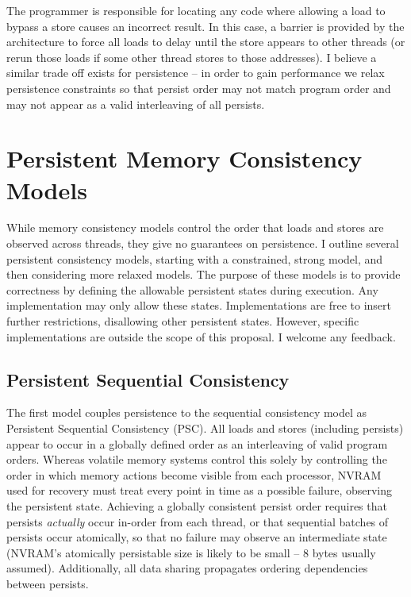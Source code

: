 The programmer is responsible for locating any code where allowing a load to bypass a store causes an incorrect result.
In this case, a barrier is provided by the architecture to force all loads to delay until the store appears to other threads (or rerun those loads if some other thread stores to those addresses).
I believe a similar trade off exists for persistence -- in order to gain performance we relax persistence constraints so that persist order may not match program order and may not appear as a valid interleaving of all persists.

\section{Persistent Memory Consistency Models}
\label{sec:PMC:PersistenceModels}

While memory consistency models control the order that loads and stores are observed across threads, they give no guarantees on persistence.
I outline several persistent consistency models, starting with a constrained, strong model, and then considering more relaxed models.
The purpose of these models is to provide correctness by defining the allowable persistent states during execution.
Any implementation may only allow these states.
Implementations are free to insert further restrictions, disallowing other persistent states.
However, specific implementations are outside the scope of this proposal.
I welcome any feedback.

\subsection{Persistent Sequential Consistency}
\label{sec:PMC:PersistenceModels:PSC}

The first model couples persistence to the sequential consistency model as Persistent Sequential Consistency (PSC).
All loads and stores (including persists) appear to occur in a globally defined order as an interleaving of valid program orders.
Whereas volatile memory systems control this solely by controlling the order in which memory actions become visible from each processor, NVRAM used for recovery must treat every point in time as a possible failure, observing the persistent state.
Achieving a globally consistent persist order requires that persists \emph{actually} occur in-order from each thread, or that sequential batches of persists occur atomically, so that no failure may observe an intermediate state (NVRAM's atomically persistable size is likely to be small -- 8 bytes usually assumed).
Additionally, all data sharing propagates ordering dependencies between persists.

